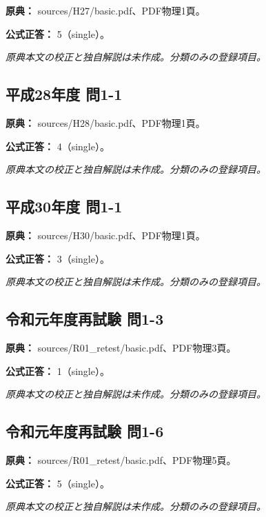 \noindent\textbf{原典：} sources/H27/basic.pdf、PDF物理1頁。

\textbf{公式正答：} 5（single）。

\par\textit{原典本文の校正と独自解説は未作成。分類のみの登録項目。}

\subsection{平成28年度 問1-1}
\label{q:h28-reg-basic-1-1}

\noindent\textbf{原典：} sources/H28/basic.pdf、PDF物理1頁。

\textbf{公式正答：} 4（single）。

\par\textit{原典本文の校正と独自解説は未作成。分類のみの登録項目。}

\subsection{平成30年度 問1-1}
\label{q:h30-reg-basic-1-1}

\noindent\textbf{原典：} sources/H30/basic.pdf、PDF物理1頁。

\textbf{公式正答：} 3（single）。

\par\textit{原典本文の校正と独自解説は未作成。分類のみの登録項目。}

\subsection{令和元年度再試験 問1-3}
\label{q:r01-ret-basic-1-3}

\noindent\textbf{原典：} sources/R01\_retest/basic.pdf、PDF物理3頁。

\textbf{公式正答：} 1（single）。

\par\textit{原典本文の校正と独自解説は未作成。分類のみの登録項目。}

\subsection{令和元年度再試験 問1-6}
\label{q:r01-ret-basic-1-6}

\noindent\textbf{原典：} sources/R01\_retest/basic.pdf、PDF物理5頁。

\textbf{公式正答：} 5（single）。

\par\textit{原典本文の校正と独自解説は未作成。分類のみの登録項目。}

